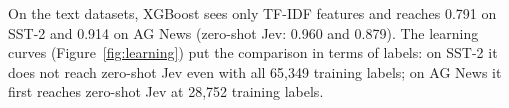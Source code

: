 On the text datasets, XGBoost sees only TF-IDF features and reaches 0.791 on SST-2 and 0.914 on AG News (zero-shot Jev: 0.960 and 0.879).
The learning curves (Figure~\ref{fig:learning}) put the comparison in terms of labels: on SST-2 it does not reach zero-shot Jev even with all 65{,}349 training labels; on AG News it first reaches zero-shot Jev at 28{,}752 training labels.
